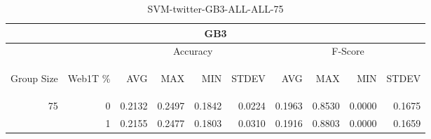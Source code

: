 \begin{center}
\begin{table}[htbp] 
 \begin{center}
\begin{tabular}{ | r | r | r | r | r | r | r | r | r | r |}
\hline
\multicolumn{10}{|c|}{GB3}\\
\hline
 & & \multicolumn{4}{|c|}{Accuracy} & \multicolumn{4}{|c|}{F-Score}\\ \cline{3-10}
\begin{sideways}Group Size\end{sideways} & \begin{sideways}Web1T \%\end{sideways} & \begin{sideways}AVG\end{sideways} & \begin{sideways}MAX\end{sideways} & \begin{sideways}MIN\end{sideways} & \begin{sideways}STDEV\end{sideways} & \begin{sideways}AVG\end{sideways} & \begin{sideways}MAX\end{sideways} & \begin{sideways}MIN\end{sideways} & \begin{sideways}STDEV\end{sideways}\\
\hline
\multirow{1}{*}{75}
 & 0 & 0.2132 & 0.2497 & 0.1842 & 0.0224 & 0.1963 & 0.8530 & 0.0000 & 0.1675\\ \cline{2-10}
 & 1 & 0.2155 & 0.2477 & 0.1803 & 0.0310 & 0.1916 & 0.8803 & 0.0000 & 0.1659\\ \cline{2-10}
\hline
\end{tabular}
\caption{SVM-twitter-GB3-ALL-ALL-75}
\label{table:SVM-twitter-GB3-ALL-ALL-75}
\end{center}
 \end{table}
\end{center}

